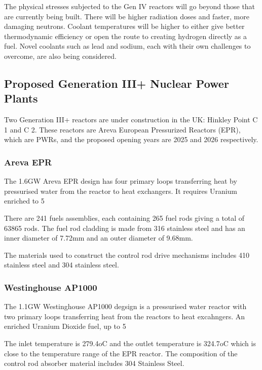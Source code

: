 The physical stresses subjected to the Gen IV reactors will go beyond those that are currently being built.  There will be higher radiation doses and faster, more damaging neutrons.  Coolant temperatures will be higher to either give better thermodynamic efficiency or open the route to creating hydrogen directly as a fuel.  Novel coolants such as lead and sodium, each with their own challenges to overcome, are also being considered.



\subsection{Proposed Generation III+ Nuclear Power Plants}

Two Generation III+ reactors are under construction in the UK: Hinkley Point C 1 and C 2.  These reactors are Areva European Pressurized Reactors (EPR), which are PWRs, and the proposed opening years are 2025 and 2026 respectively.




\subsubsection{Areva EPR}

The 1.6GW Areva EPR design has four primary loops transferring heat by pressurised water from the reactor to heat exchangers.  It requires Uranium enriched to 5%

There are 241 fuels assemblies, each containing 265 fuel rods giving a total of 63865 rods.  The fuel rod cladding is made from 316 stainless steel and has an inner diameter of 7.72mm and an outer diameter of 9.68mm.

The materials used to construct the control rod drive mechanisms includes 410 stainless steel and 304 stainless steel.


\subsubsection{Westinghouse AP1000}

The 1.1GW Westinghouse AP1000 degsign is a pressurised water reactor with two primary loops transferring heat from the reactors to heat excahngers.  An enriched Uranium Dioxide fuel, up to 5%

The inlet temperature is 279.4oC and the outlet temperature is 324.7oC which is close to the temperature range of the EPR reactor.  The composition of the control rod absorber material includes 304 Stainless Steel.










